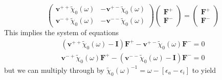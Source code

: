 \documentclass[12pt]{article}
\begin{document}
\begin{equation}
    \begin{pmatrix}
\mathbf{v}^{++}\tilde{\chi}_{0}\left(\omega\right) & -\mathbf{v}^{+-}\tilde{\chi}_{0}\left(\omega\right) \\
\mathbf{v}^{-+}\tilde{\chi}_{0}\left(\omega\right) & -\mathbf{v}^{--}\tilde{\chi}_{0}\left(\omega\right)
\end{pmatrix}
\begin{pmatrix}
\mathbf{F}^{+} \\
\mathbf{F}^{-}
\end{pmatrix}
=
\begin{pmatrix}
\mathbf{F}^{+} \\
\mathbf{F}^{-}
\end{pmatrix}
\end{equation}
This implies the system of equations
\begin{align}
    \left(\mathbf{v}^{++}\tilde{\chi}_{0}\left(\omega\right) - \mathbf{I}\right) \mathbf{F}^{+} - \mathbf{v}^{+-}\tilde{\chi}_{0}\left(\omega\right) \mathbf{F}^{-} = 0 \\
    \mathbf{v}^{-+}\tilde{\chi}_{0}\left(\omega\right) \mathbf{F}^{+} - \left(\mathbf{v}^{--}\tilde{\chi}_{0}\left(\omega\right) - \mathbf{I}\right) \mathbf{F}^{-} = 0
\end{align}
but we can multiply through by $\tilde{\chi}_{0}\left(\omega\right)^{-1} = \omega - \left[\epsilon_{a}-\epsilon_{i}\right]$ to yield
\end{document}
